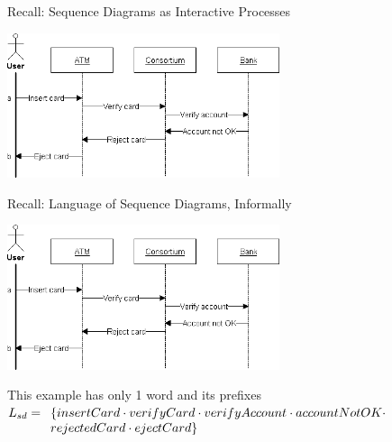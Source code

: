 \documentclass[aspectratio=169]{beamer}
\begin{document}
\begin{slide}{Recall: Sequence Diagrams as Interactive Processes}
  \centering

  \includegraphics[width=0.6\textwidth]{images/sd-simple-atm.png}

\end{slide}

\begin{slide}{Recall: Language of Sequence Diagrams, Informally}
  \centering

  \includegraphics[width=0.6\textwidth]{images/sd-simple-atm.png}

  \begin{exampleblock}{This example has only 1 word and its prefixes}
   $L_{sd} = \begin{array}[t]{l}
      \{insertCard \cdot verifyCard \cdot verifyAccount \cdot accountNotOK \cdot \\ rejectedCard \cdot ejectCard\}
      \end{array}$
  \end{exampleblock}
\end{slide}
\end{document}

